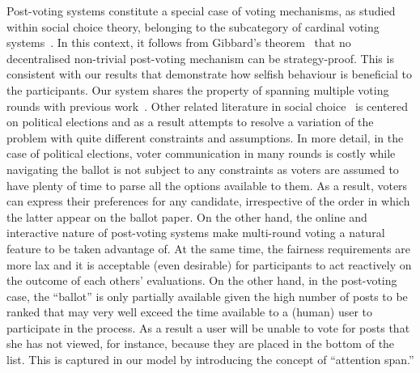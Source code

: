   Post-voting systems constitute a special case of voting mechanisms, as studied
  within social choice theory, belonging to the subcategory of cardinal voting
  systems~\cite{hillinger2005case}. In this context, it follows from Gibbard's
  theorem~\cite{gibbard1973manipulation} that no decentralised non-trivial
  post-voting mechanism can be strategy-proof. This is consistent with our
  results that demonstrate how selfish behaviour is beneficial to the
  participants. Our system shares the property of spanning multiple voting
  rounds with previous work~\cite{kalech2011practical}. Other related literature
  in social
  choice~\cite{lu2011robust,conitzer2005communication,xia2010compilation} is
  centered on political elections and as a result attempts to resolve a
  variation of the problem with quite different constraints and assumptions. In
  more detail, in the case of political elections, voter communication in many
  rounds is costly while navigating the ballot is not subject to any constraints
  as voters are assumed to have plenty of time to parse all the options
  available to them. As a result, voters can express their preferences for any
  candidate, irrespective of the order in which the latter appear on the ballot
  paper. On the other hand, the online and interactive nature of post-voting
  systems make multi-round voting a natural feature to be taken advantage of. At
  the same time, the fairness requirements are more lax and it is acceptable
  (even desirable) for participants to act reactively on the outcome of each
  others' evaluations. On the other hand, in the post-voting case, the
  ``ballot'' is only partially available given the high number of posts to be
  ranked that may very well exceed the time available to a (human) user to
  participate in the process. As a result a user will be unable to vote for
  posts that she has not viewed, for instance, because they are placed in the
  bottom of the list. This is captured in our model by introducing the concept
  of ``attention span.''

